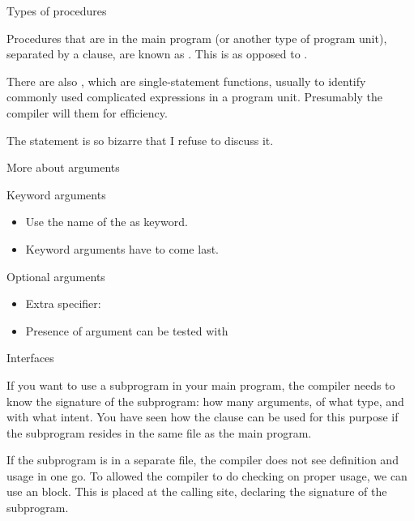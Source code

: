  {Types of procedures}

Procedures that are in the main program (or another type of program
unit), separated by a  clause, are known as
. This is as opposed to
.

There are also , which are
single-statement functions, usually to identify commonly used
complicated expressions in a program unit. Presumably the compiler
will  them for efficiency.

The  statement is so bizarre that I refuse to discuss it.

 {More about arguments}

\begin{block}{Keyword arguments}
  \label{sl:funcf:keyword}
  \begin{itemize}
  \item Use the name of the  as
    keyword.
  \item Keyword arguments have to come last.
  \end{itemize}
\end{block}

\begin{block}{Optional arguments}
  \label{sl:funcf:optional}
  \begin{itemize}
  \item Extra specifier: 
  \item Presence of argument can be tested with 
  \end{itemize}
\end{block}

 {Interfaces}
\label{sec:finterface}

If you want to use a subprogram in your main program, the compiler
needs to know the signature of the subprogram: how many arguments, of
what type, and with what intent. You have seen how the
 clause can be used for this purpose if the
subprogram resides in the same file as the main program.

If the subprogram is in a separate file, the compiler does not see
definition and usage in one go. To allowed the compiler to do checking
on proper usage, we can use an  block. This
is placed at the calling site, declaring the signature of the
subprogram.

